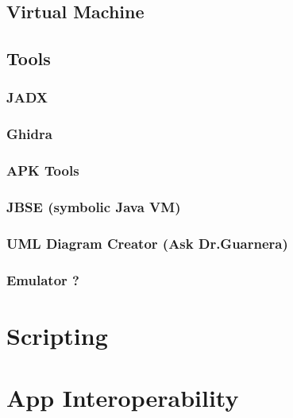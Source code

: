 \subsection{Virtual Machine}
\subsection{Tools}
\subsubsection{JADX}
\subsubsection{Ghidra}
\subsubsection{APK Tools}
\subsubsection{JBSE (symbolic Java VM)}
\subsubsection{UML Diagram Creator (Ask Dr.Guarnera)}
\subsubsection{Emulator ?}

\section{Scripting}
\section{App Interoperability}


